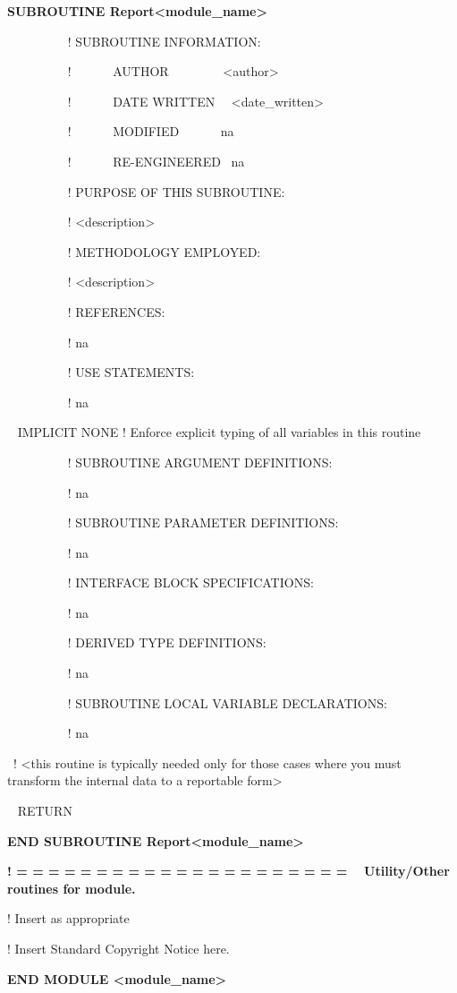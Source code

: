\textbf{SUBROUTINE Report\textless{}module\_name\textgreater{}}

~~~~~~~~~ ! SUBROUTINE INFORMATION:

~~~~~~~~~ !~~~~~~ AUTHOR~~~~~~~~ \textless{}author\textgreater{}

~~~~~~~~~ !~~~~~~ DATE WRITTEN~~ \textless{}date\_written\textgreater{}

~~~~~~~~~ !~~~~~~ MODIFIED~~~~~~ na

~~~~~~~~~ !~~~~~~ RE-ENGINEERED~ na

~~~~~~~~~ ! PURPOSE OF THIS SUBROUTINE:

~~~~~~~~~ ! \textless{}description\textgreater{}

~~~~~~~~~ ! METHODOLOGY EMPLOYED:

~~~~~~~~~ ! \textless{}description\textgreater{}

~~~~~~~~~ ! REFERENCES:

~~~~~~~~~ ! na

~~~~~~~~~ ! USE STATEMENTS:

~~~~~~~~~ ! na

~ IMPLICIT NONE ! Enforce explicit typing of all variables in this routine

~~~~~~~~~ ! SUBROUTINE ARGUMENT DEFINITIONS:

~~~~~~~~~ ! na

~~~~~~~~~ ! SUBROUTINE PARAMETER DEFINITIONS:

~~~~~~~~~ ! na

~~~~~~~~~ ! INTERFACE BLOCK SPECIFICATIONS:

~~~~~~~~~ ! na

~~~~~~~~~ ! DERIVED TYPE DEFINITIONS:

~~~~~~~~~ ! na

~~~~~~~~~ ! SUBROUTINE LOCAL VARIABLE DECLARATIONS:

~~~~~~~~~ ! na

~! \textless{}this routine is typically needed only for those cases where you must transform the internal data to a reportable form\textgreater{}

~ RETURN

\textbf{END SUBROUTINE Report\textless{}module\_name\textgreater{}}

\textbf{! = = = = = = = = = = = = = = = = = = = = = ~ Utility/Other routines for module.}

! Insert as appropriate

! Insert Standard Copyright Notice here.

\textbf{END MODULE \textless{}module\_name\textgreater{}}

